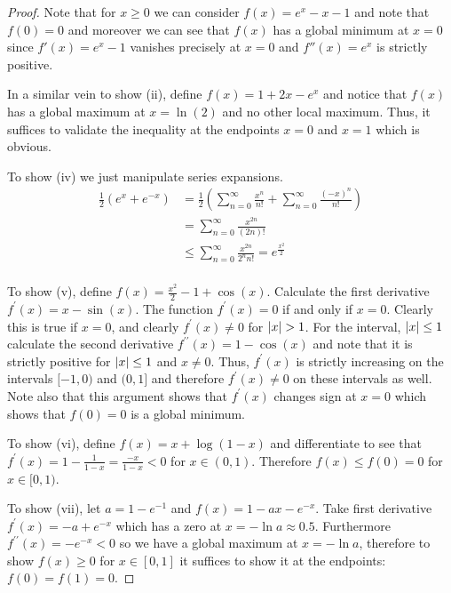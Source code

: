\documentclass{amsart}
\theoremstyle{remark}
\theoremstyle{definition}
\begin{document}
\begin{proof}
Note that for ${x\geq0}$ we can consider $f(x) = e^x - x -1$ and note
that $f(0)=0$ and moreover we can see that $f(x)$ has a global minimum
at $x=0$ since $f'(x) = e^x - 1$ vanishes precisely at $x=0$ and
$f''(x)=e^x$ is strictly positive.

In a similar vein to show (ii), define $f(x) = 1+2x-e^x$ and notice that $f(x)$ has
a global maximum at $x=\ln(2)$ and no other local maximum.  Thus, it
suffices to validate the inequality at the endpoints $x=0$ and $x=1$
which is obvious.

To show (iv) we just manipulate series expansions.
\begin{align*}
\frac{1}{2}\left(e^x + e^{-x}\right) & = \frac{1}{2}\left(\sum_{n=0}^\infty
\frac{x^n}{n!} + \sum_{n=0}^\infty \frac{(-x)^n}{n!}\right) \\
& = \sum_{n=0}^\infty \frac{x^{2n}}{(2n)!} \\
& \leq \sum_{n=0}^\infty \frac{x^{2n}}{2^n n!} = e^{\frac{x^2}{2}}\\
\end{align*}

To show (v), define $f(x) = \frac{x^2}{2} -1 +  \cos(x)$.  Calculate
the first derivative $f^\prime(x) = x - \sin(x)$.  The function
$f^\prime(x) = 0$ if and only if $x=0$.  Clearly this is true if
$x=0$, and clearly $f^\prime(x) \neq 0$ for $\left \vert x \right \vert > 1$.  For the
interval, $\left \vert x \right \vert \leq 1$ calculate the second derivative
$f^{\prime\prime}(x) = 1 - \cos(x)$ and note that it is strictly
positive for $\left \vert x \right \vert \leq 1$ and $x \neq 0$.  Thus, $f^\prime(x)$ is
strictly increasing on the intervals $[-1,0)$ and $(0,1]$ and
therefore $f^\prime(x) \neq 0$ on these intervals as well.  Note also
that this argument shows that $f^\prime(x)$ changes sign at $x=0$
which shows that $f(0) = 0$ is a global minimum.

To show (vi), define $f(x) = x + \log(1 -x)$ and differentiate to see
that $f^\prime(x) = 1 - \frac{1}{1-x} = \frac{-x}{1-x} < 0$ for $x \in
(0,1)$.  Therefore $f(x) \leq f(0)=0$ for $x \in [0,1)$.

To show (vii), let $a = 1 - e^{-1}$ and $f(x) = 1 - ax - e^{-x}$.
Take first derivative $f^\prime(x) = -a + e^{-x}$ which has a zero at
$x = -\ln a \approx 0.5$.  Furthermore $f^{\prime \prime}(x) = -e^{-x}
< 0$ so we have a global maximum at $x = -\ln a$, therefore to show
$f(x) \geq 0$  for $x \in [0,1]$ it suffices to show it at the
endpoints: $f(0) = f(1) = 0$.
\end{proof}
\end{document}
